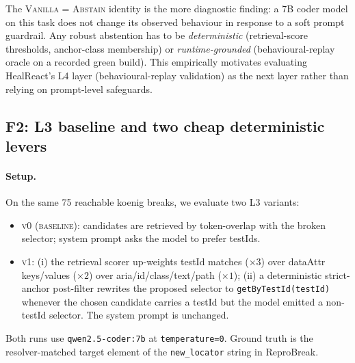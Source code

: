 The \textsc{Vanilla = Abstain} identity is the more diagnostic finding: a 7B coder model on this task does not change its observed behaviour in response to a soft prompt guardrail. Any robust abstention has to be \emph{deterministic} (retrieval-score thresholds, anchor-class membership) or \emph{runtime-grounded} (behavioural-replay oracle on a recorded green build). This empirically motivates evaluating HealReact's L4 layer (behavioural-replay validation) as the next layer rather than relying on prompt-level safeguards.

\subsection{F2: L3 baseline and two cheap deterministic levers}
\label{sec:f2}

\paragraph{Setup.}
On the same 75 reachable koenig breaks, we evaluate two L3 variants:
\begin{itemize}
\item \textsc{v0 (baseline)}: candidates are retrieved by token-overlap with the broken selector; system prompt asks the model to prefer testIds.
\item \textsc{v1}: (i) the retrieval scorer up-weights testId matches ($\times 3$) over dataAttr keys/values ($\times 2$) over aria/id/class/text/path ($\times 1$); (ii) a deterministic strict-anchor post-filter rewrites the proposed selector to \texttt{getByTestId(testId)} whenever the chosen candidate carries a testId but the model emitted a non-testId selector. The system prompt is unchanged.
\end{itemize}

Both runs use \texttt{qwen2.5-coder:7b} at \texttt{temperature=0}. Ground truth is the resolver-matched target element of the \texttt{new\_locator} string in ReproBreak.

